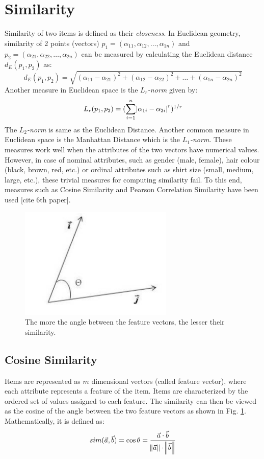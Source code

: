 \section{Similarity}
Similarity of two items is defined as their \textit{closeness}. In Euclidean geometry, similarity of 2 points (vectors) $p_1=(\alpha_{11}, \alpha_{12},\dots,\alpha_{1n})$ and $p_2=(\alpha_{21}, \alpha_{22},\dots,\alpha_{2n})$ can be measured by calculating the Euclidean distance $d_E(p_1,p_2)$ as:
\begin{equation}
d_E(p_1,p_2) = \sqrt{(\alpha_{11}-\alpha_{21})^2+(\alpha_{12}-\alpha_{22})^2+\dots +(\alpha_{1n}-\alpha_{2n})^2} \nonumber
\end{equation}
Another measure in Euclidean space is the \textit{$L_r$-norm} given by:
\begin{equation}
L_r(p_1,p_2) = (\displaystyle\sum_{i=1}^n \abs{\alpha_{1i}-\alpha_{2i}}^r)^{1/r}
\end{equation}
The \textit{$L_2$-norm} is same as the Euclidean Distance. Another common measure in Euclidean space is the Manhattan Distance which is the \textit{$L_1$-norm}. These measures work well when the attributes of the two vectors have numerical values. However, in case of nominal attributes, such as gender (male, female), hair colour (black, brown, red, etc.) or ordinal attributes such as shirt size (small, medium, large, etc.), these trivial measures for computing similarity fail. To this end, measures such as Cosine Similarity and Pearson Correlation Similarity have been used [cite 6th paper].

\begin{figure}[ht]
\centering
\includegraphics[height=0.35\columnwidth]{cosine}
\caption{The more the angle between the feature vectors, the lesser their similarity.}
\label{fig:cosine}
\end{figure}
\subsection{Cosine Similarity}
Items are represented as $m$ dimensional vectors (called feature vector), where each attribute represents a feature of the item. Items are characterized by the ordered set of values assigned to each feature. The similarity can then be viewed as the cosine of the angle between the two feature vectors as shown in Fig. \ref{fig:cosine}. Mathematically, it is defined as:
\begin{equation}
sim(\vec{a},\vec{b})=\cos\theta=\frac{\vec{a}\cdot\vec{b}}{\norm{\vec{a}}\cdot\norm{\vec{b}}}
\end{equation}

